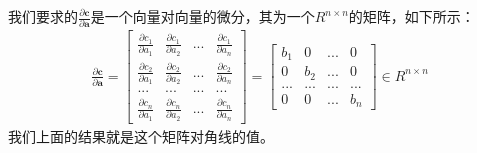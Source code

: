 我们要求的$\frac{\partial \boldsymbol{c}}{\partial \boldsymbol{a}}$是一个向量对向量的微分，其为一个$R^{n \times n}$的矩阵，如下所示：
\begin{equation}
\begin{aligned}
\frac{\partial \boldsymbol{c}}{\partial \boldsymbol{a}} = \begin{bmatrix}
	\frac{\partial c_{1}}{\partial a_{1}} & \frac{\partial c_{1}}{\partial a_{2}} & ... & \frac{\partial c_{1}}{\partial a_{n}} \\
	\frac{\partial c_{2}}{\partial a_{1}} & \frac{\partial c_{2}}{\partial a_{2}} & ... & \frac{\partial c_{2}}{\partial a_{n}} \\
	... & ... & ... & ... \\
	\frac{\partial c_{n}}{\partial a_{1}} & \frac{\partial c_{n}}{\partial a_{2}} & ... & \frac{\partial c_{n}}{\partial a_{n}}
\end{bmatrix}  = \begin{bmatrix}
	b_{1} & 0 & ... & 0 \\
	0 & b_{2} & ... & 0 \\
	... & ... & ... & ... \\
	0 & 0 & ... & b_{n}
\end{bmatrix} \in R^{n \times n}
\end{aligned}
\label{chpZ01-vector-elementwise-mul}
\end{equation}
我们上面的结果就是这个矩阵对角线的值。


